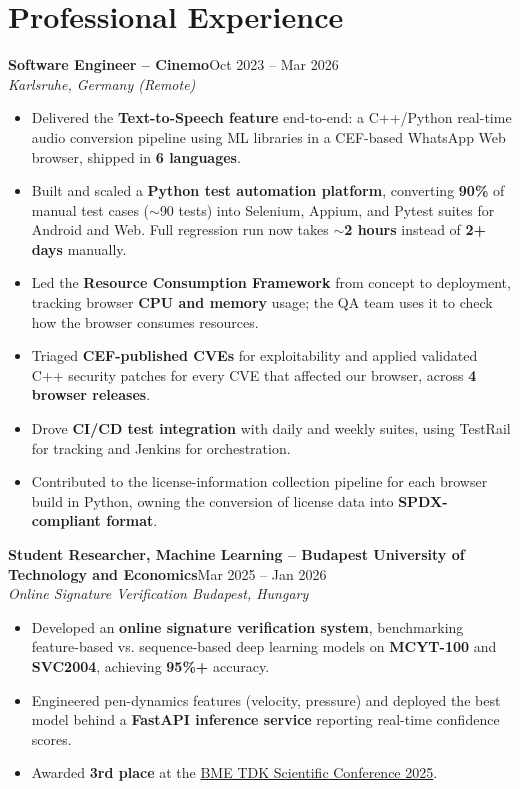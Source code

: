 \documentclass[letterpaper,10pt]{article}
\newcommand{\job}[3]{%
  \textbf{#1}\hfill #3\\
  \textit{#2}\vspace{1pt}}
\begin{document}
\section{Professional Experience}
\job{Software Engineer -- Cinemo}{Karlsruhe, Germany (Remote)}{Oct 2023 -- Mar 2026}
\begin{itemize}
  \item Delivered the \textbf{Text-to-Speech feature} end-to-end: a C++/Python real-time audio conversion pipeline using ML libraries in a CEF-based WhatsApp Web browser, shipped in \textbf{6 languages}.
  \item Built and scaled a \textbf{Python test automation platform}, converting \textbf{90\%} of manual test cases (${\sim}$90 tests) into Selenium, Appium, and Pytest suites for Android and Web. Full regression run now takes ${\sim}$\textbf{2 hours} instead of \textbf{2+ days} manually.
  \item Led the \textbf{Resource Consumption Framework} from concept to deployment, tracking browser \textbf{CPU and memory} usage; the QA team uses it to check how the browser consumes resources.
  \item Triaged \textbf{CEF-published CVEs} for exploitability and applied validated C++ security patches for every CVE that affected our browser, across \textbf{4 browser releases}.
  \item Drove \textbf{CI/CD test integration} with daily and weekly suites, using TestRail for tracking and Jenkins for orchestration.
  \item Contributed to the license-information collection pipeline for each browser build in Python, owning the conversion of license data into \textbf{SPDX-compliant format}.
\end{itemize}

\vspace{4pt}
\job{Student Researcher, Machine Learning -- Budapest University of Technology and Economics}{Online Signature Verification \textbar{} Budapest, Hungary}{Mar 2025 -- Jan 2026}
\begin{itemize}
  \item Developed an \textbf{online signature verification system}, benchmarking feature-based vs. sequence-based deep learning models on \textbf{MCYT-100} and \textbf{SVC2004}, achieving \textbf{95\%+} accuracy.
  \item Engineered pen-dynamics features (velocity, pressure) and deployed the best model behind a \textbf{FastAPI inference service} reporting real-time confidence scores.
  \item Awarded \textbf{3rd place} at the \href{https://tdk.bme.hu/conference/VIK/2025/sessions/jelfel/paper/FeatureBased-and-SequenceBased-Approaches}{BME TDK Scientific Conference 2025}.
\end{itemize}
\end{document}
